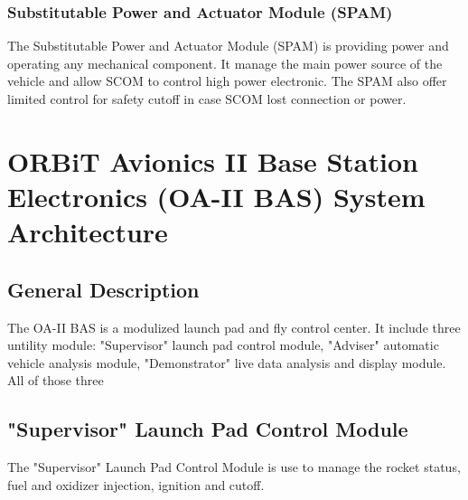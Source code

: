 \documentclass[12pt,article]{memoir}
\begin{document}
\subsection{Substitutable Power and Actuator Module (SPAM)}%
The Substitutable Power and Actuator Module (SPAM) is providing power and operating any mechanical component. It manage the main power source of the vehicle and allow SCOM to control high power electronic. The SPAM also offer limited control for safety cutoff in case SCOM lost connection or power.
\chapter{ORBiT Avionics II Base Station Electronics (OA-II BAS) System Architecture}
\section{General Description}
The OA-II BAS is a modulized launch pad and fly control center. It include three untility module: "Supervisor" launch pad control module, "Adviser" automatic vehicle analysis module, "Demonstrator" live data analysis and display module. All of those three 
\section{"Supervisor" Launch Pad Control Module}
The "Supervisor" Launch Pad Control Module is use to manage the rocket status, fuel and oxidizer injection, ignition and cutoff.
\end{document}
